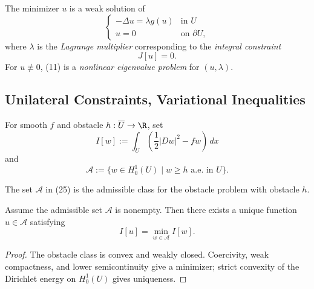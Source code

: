 \begin{remark}
\label{rem:nonlinear-eigenvalue-lagrange-multiplier-interpretation}
The minimizer $u$ is a weak solution of
\[
\begin{cases}
-\Delta u = \lambda g(u) & \text{in } U \\
u = 0 & \text{on } \partial U,
\end{cases}
\tag{11}
\]
where $\lambda$ is the \textit{Lagrange multiplier} corresponding to the \textit{integral constraint}
\[
J[u] = 0.
\tag{12}
\]
For $u\not\equiv0$, (11) is a \textit{nonlinear eigenvalue problem} for $(u,\lambda)$.
\end{remark}

\subsection{Unilateral Constraints, Variational Inequalities}
\label{sec:unilateral-constraints-variational-inequalities}

For smooth $f$ and obstacle $h:\overline U\to\R$, set
\[
I[w]:=\int_U\left(\frac12|Dw|^2-fw\right)\,dx
\tag{24}
\]
and
\[
\mathcal A:=\{w\in H_0^1(U)\mid w\geq h\text{ a.e. in }U\}.
\tag{25}
\]

\begin{definition}
\label{def:admissible-class-obstacle-problem}
The set $\mathcal A$ in (25) is the admissible class for the obstacle problem with obstacle $h$.
\end{definition}

\begin{theorem}
\label{thm:existence-minimizer-obstacle-problem}
Assume the admissible set $\mathcal{A}$ is nonempty. Then there exists a unique function $u \in \mathcal{A}$ satisfying
\[
I[u] = \min_{w \in \mathcal{A}} I[w].
\]
\end{theorem}

\begin{proof}
\sketch The obstacle class is convex and weakly closed. Coercivity, weak compactness, and lower semicontinuity give a minimizer; strict convexity of the Dirichlet energy on $H_0^1(U)$ gives uniqueness.
\end{proof}

